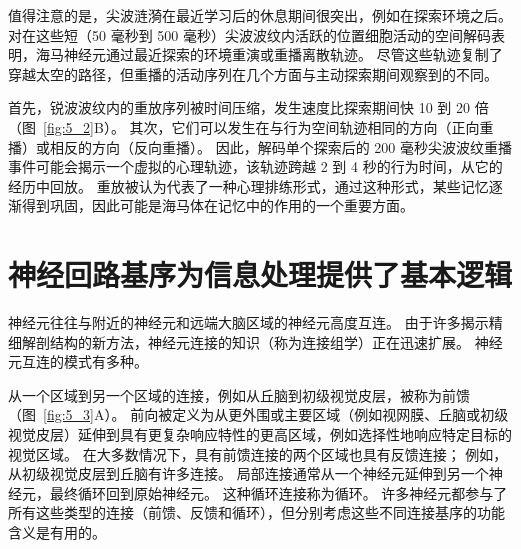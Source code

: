 值得注意的是，尖波涟漪在最近学习后的休息期间很突出，例如在探索环境之后。
对在这些短（50 毫秒到 500 毫秒）尖波波纹内活跃的位置细胞活动的空间解码表明，海马神经元通过最近探索的环境重演或重播离散轨迹。
尽管这些轨迹复制了穿越太空的路径，但重播的活动序列在几个方面与主动探索期间观察到的不同。


首先，锐波波纹内的重放序列被时间压缩，发生速度比探索期间快 10 到 20 倍（图~\ref{fig:5_2}B）。 
其次，它们可以发生在与行为空间轨迹相同的方向（正向重播）或相反的方向（反向重播）。
因此，解码单个探索后的 200 毫秒尖波波纹重播事件可能会揭示一个虚拟的心理轨迹，该轨迹跨越 2 到 4 秒的行为时间，从它的经历中回放。
重放被认为代表了一种心理排练形式，通过这种形式，某些记忆逐渐得到巩固，因此可能是海马体在记忆中的作用的一个重要方面。



\section{神经回路基序为信息处理提供了基本逻辑}

神经元往往与附近的神经元和远端大脑区域的神经元高度互连。
由于许多揭示精细解剖结构的新方法，神经元连接的知识（称为连接组学）正在迅速扩展。
神经元互连的模式有多种。


从一个区域到另一个区域的连接，例如从丘脑到初级视觉皮层，被称为前馈（图~\ref{fig:5_3}A）。 
前向被定义为从更外围或主要区域（例如视网膜、丘脑或初级视觉皮层）延伸到具有更复杂响应特性的更高区域，例如选择性地响应特定目标的视觉区域。
在大多数情况下，具有前馈连接的两个区域也具有反馈连接；
例如，从初级视觉皮层到丘脑有许多连接。
局部连接通常从一个神经元延伸到另一个神经元，最终循环回到原始神经元。
这种循环连接称为循环。
许多神经元都参与了所有这些类型的连接（前馈、反馈和循环），但分别考虑这些不同连接基序的功能含义是有用的。


